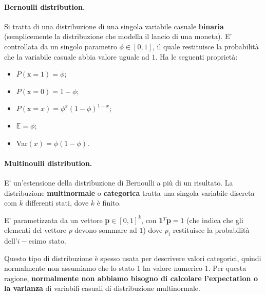 \paragraph{Bernoulli distribution.} Si tratta di una distribuzione di una singola variabile casuale \textbf{binaria} (semplicemente la distribuzione che modella il lancio di una moneta). E' controllata da un singolo parametro $\phi\in[0,1]$, il quale restituisce la probabilità che la variabile casuale abbia valore uguale ad $1$. Ha le seguenti proprietà:
\begin{itemize}
    \item $P(\text{x}=1)=\phi$;
    \item $P(\text{x}=0)=1-\phi$;
    \item $P(\text{x}=x)=\phi^x(1-\phi)^{1-x}$;
    \item $\mathbb{E}=\phi$;
    \item Var$(x)=\phi(1-\phi)$.
\end{itemize}


\paragraph{Multinoulli distribution.} E' un'estensione della distribuzione di Bernoulli a più di un risultato. La distribuzione \textbf{multinormale} o \textbf{categorica} tratta una singola variabile discreta com $k$ differenti stati, dove $k$ è finito.


E' parametizzata da un vettore \textbf{p}$\in[0,1]^k$, con \textbf{1}$^T$\textbf{p}$=1$ (che indica che gli elementi del vettore $p$ devono sommare ad $1$) dove $p_i$ restituisce la probabilità dell'$i-$esimo stato. 


Questo tipo di distribuzione è spesso usata per descrivere valori categorici, quindi normalmente non assumiamo che lo stato 1 ha valore numerico 1. Per questa ragione, \textbf{normalmente non abbiamo bisogno di calcolare l'expectation o la varianza} di variabili casuali di distribuzione multinormale.



